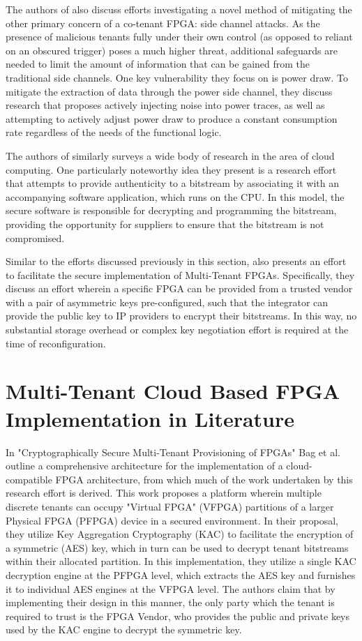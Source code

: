 The authors of \cite{jin_security_2020} also discuss efforts investigating a novel method of mitigating the other primary concern of a co-tenant FPGA: side channel attacks. As the presence of malicious tenants fully under their own control (as opposed to reliant on an obscured trigger) poses a much higher threat, additional safeguards are needed to limit the amount of information that can be gained from the traditional side channels. One key vulnerability they focus on is power draw. To mitigate the extraction of data through the power side channel, they discuss research that proposes actively injecting noise into power traces, as well as attempting to actively adjust power draw to produce a constant consumption rate regardless of the needs of the functional logic.

The authors of \cite{turan_trust_2020} similarly surveys a wide body of research in the area of cloud computing. One particularly noteworthy idea they present is a research effort that attempts to provide authenticity to a bitstream by associating it with an accompanying software application, which runs on the CPU. In this model, the secure software is responsible for decrypting and programming the bitstream, providing the opportunity for suppliers to ensure that the bitstream is not compromised.

Similar to the efforts discussed previously in this section, \cite{turan_trust_2020} also presents an effort to facilitate the secure implementation of Multi-Tenant FPGAs. Specifically, they discuss an effort wherein a specific FPGA can be provided from a trusted vendor with a pair of asymmetric keys pre-configured, such that the integrator can provide the public key to IP providers to encrypt their bitstreams. In this way, no substantial storage overhead or complex key negotiation effort is required at the time of reconfiguration.

\section{Multi-Tenant Cloud Based FPGA Implementation in Literature}\label{sec:LitImpl}
In "Cryptographically Secure Multi-Tenant Provisioning of FPGAs"\cite{bag_cryptographically_2020} Bag et al. outline a comprehensive architecture for the implementation of a cloud-compatible FPGA architecture, from which much of the work undertaken by this research effort is derived. This work proposes a platform wherein multiple discrete tenants can occupy "Virtual FPGA" (VFPGA) partitions of a larger Physical FPGA (PFPGA) device in a secured environment. In their proposal, they utilize Key Aggregation Cryptography (KAC) to facilitate the encryption of a symmetric (AES) key, which in turn can be used to decrypt tenant bitstreams within their allocated partition. In this implementation, they utilize a single KAC decryption engine at the PFPGA level, which extracts the AES key and furnishes it to individual AES engines at the VFPGA level. The authors claim that by implementing their design in this manner, the only party which the tenant is required to trust is the FPGA Vendor, who provides the public and private keys used by the KAC engine to decrypt the symmetric key.

